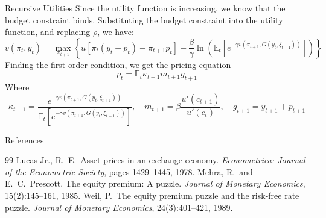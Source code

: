 \documentclass[aspectratio=169,xcolor=dvipsnames]{beamer}
\begin{document}
\begin{frame}{Recursive Utilities}
    Since the utility function is increasing, we know that the budget constraint binds. Substituting the budget constraint into the utility function, and replacing $\rho$, we have:
    \[
        v(\pi_t, y_t) = \max_{\pi_{t+1}} \left\{ u\left[\pi_t(y_t + p_t) - \pi_{t+1} p_t\right] - \frac{\beta}{\gamma} \ln \left( \mathbb{E}_t \left[ e^{-\gamma v(\pi_{t+1}, G(y_t, \xi_{t+1}))}\right]\right)\right\}
    \]
    Finding the first order condition, we get the pricing equation
    \[
        p_t = \mathbb{E}_t \kappa_{t+1} m_{t+1} g_{t+1}
    \]
    Where
    \[
        \kappa_{t+1} = \frac{e^{-\gamma v(\pi_{t+1}, G(y_t, \xi_{t+1}))}}{\mathbb{E}_t \left[ e^{-\gamma v(\pi_{t+1}, G(y_t, \xi_{t+1}))}\right]}, \quad m_{t+1} = \beta \frac{u'(c_{t+1})}{u'(c_t)}, \quad g_{t+1} = y_{t+1} + p_{t+1}
    \]
\end{frame}

\begin{frame}[allowframebreaks]{References}
    \small
    \begin{thebibliography}{99}
            Lucas Jr., R.\ E.\ Asset prices in an exchange economy. \textit{Econometrica: Journal of the Econometric Society}, pages 1429--1445, 1978.
            Mehra, R.\ and E.\ C.\ Prescott. The equity premium: A puzzle. \textit{Journal of Monetary Economics}, 15(2):145--161, 1985.
            Weil, P.\ The equity premium puzzle and the risk-free rate puzzle. \textit{Journal of Monetary Economics}, 24(3):401--421, 1989.
    \end{thebibliography}
\end{frame}
\end{document}

